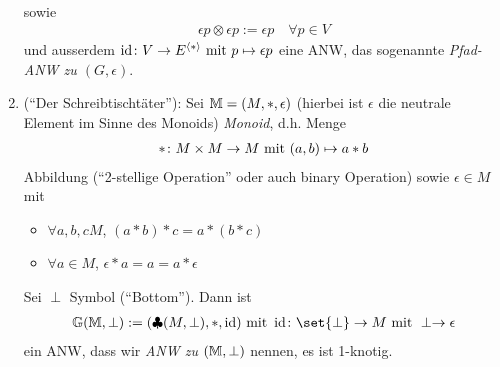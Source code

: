 \begin{example}
\begin{enumerate}
\begin{align*}
        \end{align*}
        sowie
        \begin{align*}
            \epsilon p \otimes \epsilon p := \epsilon p \quad \forall p \in V
        \end{align*}
        und ausserdem $\id\colon V \to E^{\Gen{\ast}} \mit p \mapsto \epsilon p$ eine ANW, das sogenannte \emph{Pfad-ANW zu $(G, \epsilon)$}.
        \item (``Der Schreibtischtäter''): Sei $\M=(M, \ast, \epsilon)$ (hierbei ist $\epsilon$ die neutrale Element im Sinne des Monoids) \emph{Monoid}, d.h. Menge 
        \begin{align*}
            \ast\colon M \times M \to M \mit (a,b) \mapsto a \ast b
        \end{align*}
        Abbildung (``2-stellige Operation'' oder auch binary Operation) sowie $\epsilon \in M$ mit
        \begin{itemize}
            \item $\forall a,b,c M$, $(a \ast b)\ast c = a \ast (b \ast c)$
            \item $\forall a \in M$, $\epsilon \ast a = a = a \ast \epsilon$
        \end{itemize}
        Sei $\perp$ Symbol (``Bottom''). Dann ist
        \begin{align*}
            \G(\M,\perp) := (\cloverleaf(M,\perp), \ast, \id) \mit \id \colon \set{\perp} \to M \mit \perp \to \epsilon
        \end{align*}
        ein ANW, dass wir \emph{ANW zu $(\M, \perp)$} nennen, es ist 1-knotig.
    \end{enumerate}
\end{example}
